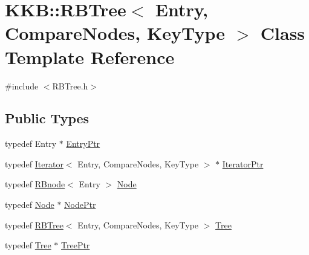\hypertarget{class_k_k_b_1_1_r_b_tree}{}\section{K\+KB\+:\+:R\+B\+Tree$<$ Entry, Compare\+Nodes, Key\+Type $>$ Class Template Reference}
\label{class_k_k_b_1_1_r_b_tree}


{\ttfamily \#include $<$R\+B\+Tree.\+h$>$}

\subsection*{Public Types}
\begin{DoxyCompactItemize}
\item 
typedef Entry $\ast$ \hyperlink{class_k_k_b_1_1_r_b_tree_a0e7710d8357973338c99b99034b17f33}{Entry\+Ptr}
\item 
typedef \hyperlink{class_k_k_b_1_1_iterator}{Iterator}$<$ Entry, Compare\+Nodes, Key\+Type $>$ $\ast$ \hyperlink{class_k_k_b_1_1_r_b_tree_acc78dafbc3dcd8bc3872e29679bb3ef0}{Iterator\+Ptr}
\item 
typedef \hyperlink{class_k_k_b_1_1_r_bnode}{R\+Bnode}$<$ Entry $>$ \hyperlink{class_k_k_b_1_1_r_b_tree_a06ef741f6d070fe4faebde70eec7ec6a}{Node}
\item 
typedef \hyperlink{class_k_k_b_1_1_r_b_tree_a06ef741f6d070fe4faebde70eec7ec6a}{Node} $\ast$ \hyperlink{class_k_k_b_1_1_r_b_tree_a6b0f3cc33c4554c51afe9bbb82c41906}{Node\+Ptr}
\item 
typedef \hyperlink{class_k_k_b_1_1_r_b_tree}{R\+B\+Tree}$<$ Entry, Compare\+Nodes, Key\+Type $>$ \hyperlink{class_k_k_b_1_1_r_b_tree_a4d849196b2997a6021ea34ef77901eb0}{Tree}
\item 
typedef \hyperlink{class_k_k_b_1_1_r_b_tree_a4d849196b2997a6021ea34ef77901eb0}{Tree} $\ast$ \hyperlink{class_k_k_b_1_1_r_b_tree_a657196027b6c9741e01cb4563b7bf28b}{Tree\+Ptr}
\end{DoxyCompactItemize}
